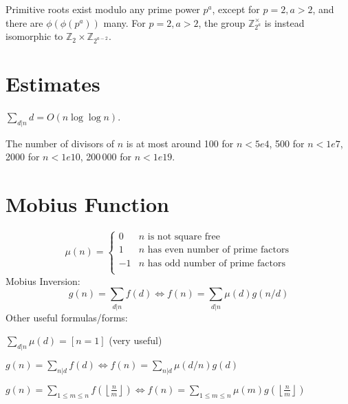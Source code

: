 	Primitive roots exist modulo any prime power $p^a$, except for $p = 2, a > 2$, and there are $\phi(\phi(p^a))$ many.
	For $p = 2, a > 2$, the group $\mathbb Z_{2^a}^\times$ is instead isomorphic to $\mathbb Z_2 \times \mathbb Z_{2^{a-2}}$.

\section{Estimates}
	$\sum_{d|n} d = O(n \log \log n)$.

	The number of divisors of $n$ is at most around 100 for $n < 5e4$, 500 for $n < 1e7$, 2000 for $n < 1e10$, 200\,000 for $n < 1e19$.

\section{Mobius Function}
\[
	\mu(n) = \begin{cases} 0 & n \textrm{ is not square free}\\ 1 & n \textrm{ has even number of prime factors}\\ -1 & n \textrm{ has odd number of prime factors}\\\end{cases}
\]
Mobius Inversion:
\[ g(n) = \sum_{d|n} f(d) \Leftrightarrow f(n) = \sum_{d|n} \mu(d)g(n/d) \]
Other useful formulas/forms:

$ \sum_{d | n} \mu(d) = [ n = 1] $ (very useful)

$ g(n) = \sum_{n|d} f(d) \Leftrightarrow f(n) = \sum_{n|d} \mu(d/n)g(d)$

$ g(n) = \sum_{1 \leq m \leq n} f(\left\lfloor\frac{n}{m}\right \rfloor ) \Leftrightarrow f(n) = \sum_{1\leq m\leq n} \mu(m)g(\left\lfloor\frac{n}{m}\right\rfloor)$

